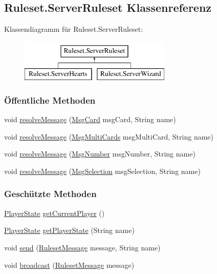 \hypertarget{a00081}{\subsection{Ruleset.\-Server\-Ruleset Klassenreferenz}
\label{a00081}
}
Klassendiagramm für Ruleset.\-Server\-Ruleset\-:\begin{figure}[H]
\begin{center}
\leavevmode
\includegraphics[height=2.000000cm]{a00081}
\end{center}
\end{figure}
\subsubsection*{Öffentliche Methoden}
\begin{DoxyCompactItemize}
\item 
void \hyperlink{a00081_afcfbddd7397a6043913b5e742934d2c2}{resolve\-Message} (\hyperlink{a00057}{Msg\-Card} msg\-Card, String name)
\item 
void \hyperlink{a00081_ac639a8d99c0e2243f9f3fe565a315c51}{resolve\-Message} (\hyperlink{a00060}{Msg\-Multi\-Cards} msg\-Multi\-Card, String name)
\item 
void \hyperlink{a00081_a9f1a95cc9488d8a9519ce69718f91322}{resolve\-Message} (\hyperlink{a00063}{Msg\-Number} msg\-Number, String name)
\item 
void \hyperlink{a00081_ada2667ea093481a58f253f43ff6cc49f}{resolve\-Message} (\hyperlink{a00065}{Msg\-Selection} msg\-Selection, String name)
\end{DoxyCompactItemize}
\subsubsection*{Geschützte Methoden}
\begin{DoxyCompactItemize}
\item 
\hyperlink{a00074}{Player\-State} \hyperlink{a00081_a473a55c851bbda707b25948c39334a8a}{get\-Current\-Player} ()
\item 
\hyperlink{a00074}{Player\-State} \hyperlink{a00081_a4a5e3a0fa28ba2bd563224d875f5835c}{get\-Player\-State} (String name)
\item 
void \hyperlink{a00081_a563cbc52a93a127c608319b42bb97ec8}{send} (\hyperlink{a00075}{Ruleset\-Message} message, String name)
\item 
void \hyperlink{a00081_a58456d8d291bc054fe3c97a8239f98a1}{broadcast} (\hyperlink{a00075}{Ruleset\-Message} message)
\end{DoxyCompactItemize}


